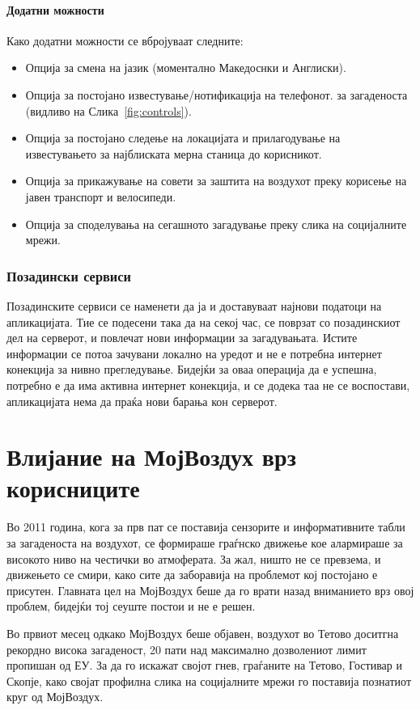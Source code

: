 \documentclass{uvamscse}
\begin{document}
\subsubsection{Додатни можности}
Како додатни можности се вбројуваат следните:
\begin{itemize}
\item Опција за смена на јазик (моментално Македоснки и Англиски).
\item Опција за постојано известување/нотификација на телефонот. за загаденоста (видливо на Слика~\ref{fig:controls}).
\item Опција за постојано следење на локацијата и прилагодување на известувањето за најблиската мерна станица до корисникот.
\item Опција за прикажување на совети за заштита на воздухот преку корисење на јавен транспорт и велосипеди.
\item Опција за споделувања на сегашното загадување преку слика на социјалните мрежи.
\end{itemize}


\subsection{Позадински сервиси}
Позадинските сервиси се наменети да ја и доставуваат најнови податоци на апликацијата. Тие се подесени така да на секој час, се поврзат со позадинскиот дел на серверот, и повлечат нови информации за загадувањата. Истите информации се потоа зачувани локално на уредот и не е потребна интернет конекција за нивно прегледување. Бидејќи за оваа операција да е успешна, потребно е да има активна интернет конекција, и се додека таа не се воспостави, апликацијата нема да праќа нови барања кон серверот.


\chapter{Влијание на МојВоздух врз корисниците}
Во 2011 година, кога за прв пат се поставија сензорите и информативните табли за загаденоста на воздухот, се формираше граѓнско движење кое алармираше за високото ниво на честички во атмоферата. За жал, ништо не се превзема, и движењето се смири, како сите да заборавија на проблемот кој постојано е присутен. Главната цел на МојВоздух беше да го врати назад вниманието врз овој проблем, бидејќи тој сеуште постои и не е решен. 
\vspace{5mm}

Во првиот месец одкако МојВоздух беше објавен, воздухот во Тетово доситгна рекордно висока загаденост, 20 пати над максимално дозволениот лимит пропишан од ЕУ. За да го искажат својот гнев, граѓаните на Тетово, Гостивар и Скопје, како својат профилна слика на социјалните мрежи го поставија познатиот круг од МојВоздух.
\end{document}
